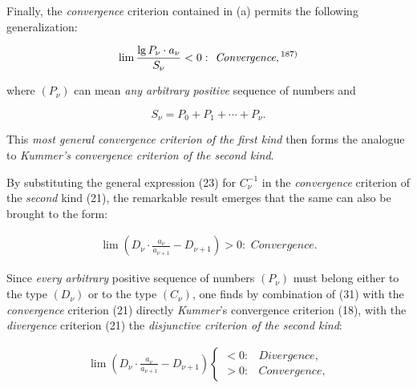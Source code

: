 \thispagestyle{fancy}

\vspace{0.5cm}

Finally, the \textit{convergence} criterion contained in (a) permits the following generalization:

\vspace{-0.7cm}
\begin{align}
    \lim \frac{\lg P_\nu \cdot a_\nu}{S_\nu} < 0: \textit{ Convergence},\textsuperscript{187)}
\end{align}
\vspace{-0.5cm}

where $(P_\nu)$ can mean \textit{any arbitrary positive} sequence of numbers and 

\vspace{-0.5cm}
$$S_\nu = P_0 + P_1 + \cdots + P_\nu.$$
\vspace{-0.5cm}

This \textit{most general convergence criterion of the first kind} then forms the analogue to \textit{Kummer's convergence criterion of the second kind}.

By substituting the general expression (23) for $C_{\nu}^{-1}$ in the \textit{convergence} criterion of the \textit{second} kind (21), the remarkable result emerges that the same can also be brought to the form:

\vspace{-0.5cm}
\begin{align}
    \lim (D_\nu \cdot \frac{a_\nu}{a_{\nu+1}} - D_{\nu+1}) > 0: \textit{ Convergence}.
\end{align}
\vspace{-0.3cm}

Since \textit{every arbitrary} positive sequence of numbers $(P_\nu)$ must belong either to the type $(D_\nu)$ or to the type $(C_\nu)$, one finds by combination of (31) with the \textit{convergence} criterion (21) directly \textit{Kummer}'s convergence criterion (18), with the \textit{divergence} criterion (21) the \textit{disjunctive criterion of the second kind}:

\vspace{-0.5cm}
\begin{align}
    \lim (D_\nu \cdot \frac{a_\nu}{a_{\nu+1}} - D_{\nu+1}) \begin{cases} < 0: & \textit{Divergence}, \\ > 0: & \textit{Convergence}, \end{cases}
\end{align}
\vspace{-0.2cm}

